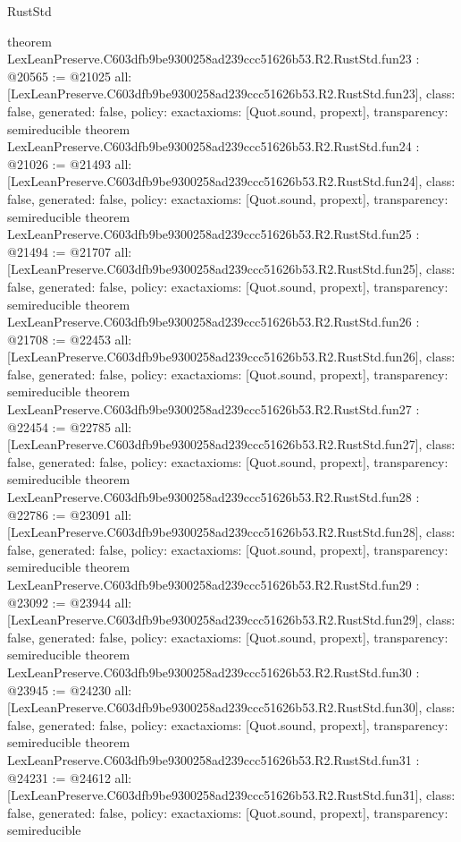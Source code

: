 \begin{lexlean}{RustStd}
\begin{coremodule}
{}
theorem LexLeanPreserve.C603dfb9be9300258ad239ccc51626b53.R2.RustStd.fun23 : @20565 := @21025 {
  all: [LexLeanPreserve.C603dfb9be9300258ad239ccc51626b53.R2.RustStd.fun23],
  class: false,
  generated: false,
  policy: exact{axioms: [Quot.sound, propext]},
  transparency: semireducible
}
theorem LexLeanPreserve.C603dfb9be9300258ad239ccc51626b53.R2.RustStd.fun24 : @21026 := @21493 {
  all: [LexLeanPreserve.C603dfb9be9300258ad239ccc51626b53.R2.RustStd.fun24],
  class: false,
  generated: false,
  policy: exact{axioms: [Quot.sound, propext]},
  transparency: semireducible
}
theorem LexLeanPreserve.C603dfb9be9300258ad239ccc51626b53.R2.RustStd.fun25 : @21494 := @21707 {
  all: [LexLeanPreserve.C603dfb9be9300258ad239ccc51626b53.R2.RustStd.fun25],
  class: false,
  generated: false,
  policy: exact{axioms: [Quot.sound, propext]},
  transparency: semireducible
}
theorem LexLeanPreserve.C603dfb9be9300258ad239ccc51626b53.R2.RustStd.fun26 : @21708 := @22453 {
  all: [LexLeanPreserve.C603dfb9be9300258ad239ccc51626b53.R2.RustStd.fun26],
  class: false,
  generated: false,
  policy: exact{axioms: [Quot.sound, propext]},
  transparency: semireducible
}
theorem LexLeanPreserve.C603dfb9be9300258ad239ccc51626b53.R2.RustStd.fun27 : @22454 := @22785 {
  all: [LexLeanPreserve.C603dfb9be9300258ad239ccc51626b53.R2.RustStd.fun27],
  class: false,
  generated: false,
  policy: exact{axioms: [Quot.sound, propext]},
  transparency: semireducible
}
theorem LexLeanPreserve.C603dfb9be9300258ad239ccc51626b53.R2.RustStd.fun28 : @22786 := @23091 {
  all: [LexLeanPreserve.C603dfb9be9300258ad239ccc51626b53.R2.RustStd.fun28],
  class: false,
  generated: false,
  policy: exact{axioms: [Quot.sound, propext]},
  transparency: semireducible
}
theorem LexLeanPreserve.C603dfb9be9300258ad239ccc51626b53.R2.RustStd.fun29 : @23092 := @23944 {
  all: [LexLeanPreserve.C603dfb9be9300258ad239ccc51626b53.R2.RustStd.fun29],
  class: false,
  generated: false,
  policy: exact{axioms: [Quot.sound, propext]},
  transparency: semireducible
}
theorem LexLeanPreserve.C603dfb9be9300258ad239ccc51626b53.R2.RustStd.fun30 : @23945 := @24230 {
  all: [LexLeanPreserve.C603dfb9be9300258ad239ccc51626b53.R2.RustStd.fun30],
  class: false,
  generated: false,
  policy: exact{axioms: [Quot.sound, propext]},
  transparency: semireducible
}
theorem LexLeanPreserve.C603dfb9be9300258ad239ccc51626b53.R2.RustStd.fun31 : @24231 := @24612 {
  all: [LexLeanPreserve.C603dfb9be9300258ad239ccc51626b53.R2.RustStd.fun31],
  class: false,
  generated: false,
  policy: exact{axioms: [Quot.sound, propext]},
  transparency: semireducible
}
\end{coremodule}
\end{lexlean}
